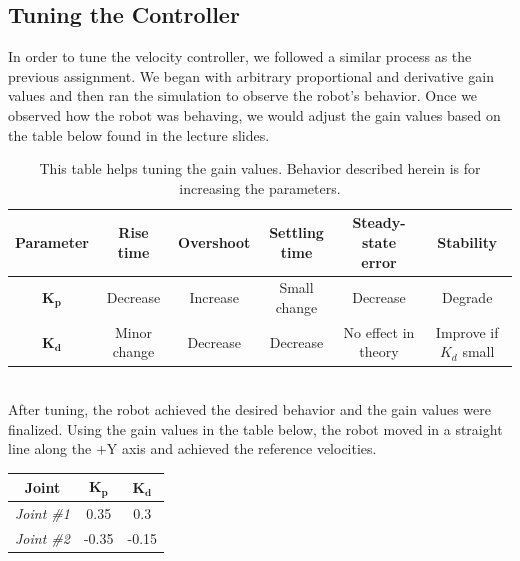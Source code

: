 \documentclass{article}
\begin{document}
\subsection{Tuning the Controller}
\vspace{0.15in}
In order to tune the velocity controller, we followed a similar process as the 
previous assignment. We began with arbitrary proportional and derivative gain values 
and then ran the simulation to observe the robot's behavior. Once we observed 
how the robot was behaving, we would adjust the gain values based on the table 
below found in the lecture slides.
\begin{table}[h!]
    \begin{center}
        \begin{tabular}{|c|c|c|c|c|c|}
        \hline
        \textbf{Parameter} & \textbf{Rise time} & \textbf{Overshoot} & \textbf{Settling time} & \textbf{Steady-state error} & \textbf{Stability} \\
        \hline
        $\mathbf{K_p}$ & Decrease & Increase & Small change & Decrease & Degrade\\
        \hline
        $\mathbf{K_d}$ & Minor change & Decrease & Decrease & No effect in theory & Improve if $K_d$ small \\
        \hline
        \end{tabular}
        \caption{This table helps tuning the gain values. Behavior described herein is for increasing the parameters.}
    \end{center}
\end{table}\\
After tuning, the robot achieved the desired behavior and the gain values were finalized. Using the gain values in the table below, 
the robot moved in a straight line along the +Y axis and achieved the
 reference velocities.
\begin{table}[h!]
    \begin{center}
        \begin{tabular}{|c|c|c|}
            \hline
            \textbf{Joint} & $\mathbf{K_p}$ & $\mathbf{K_d}$\\
            \hline
            \textit{Joint \#1} & 0.35 & 0.3\\
            \hline
            \textit{Joint \#2} & -0.35 & -0.15\\
            \hline
        \end{tabular}
    \end{center}
\end{table}
\end{document}
